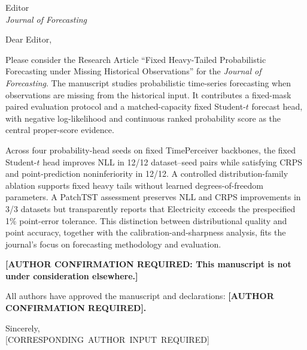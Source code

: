 \documentclass[11pt]{article}
\begin{document}
\thispagestyle{empty}
\noindent Editor\\
\emph{Journal of Forecasting}

\vspace{1em}
\noindent Dear Editor,

Please consider the Research Article ``Fixed Heavy-Tailed Probabilistic Forecasting under Missing Historical Observations'' for the \emph{Journal of Forecasting}. The manuscript studies probabilistic time-series forecasting when observations are missing from the historical input. It contributes a fixed-mask paired evaluation protocol and a matched-capacity fixed Student-$t$ forecast head, with negative log-likelihood and continuous ranked probability score as the central proper-score evidence.

Across four probability-head seeds on fixed TimePerceiver backbones, the fixed Student-$t$ head improves NLL in 12/12 dataset--seed pairs while satisfying CRPS and point-prediction noninferiority in 12/12. A controlled distribution-family ablation supports fixed heavy tails without learned degrees-of-freedom parameters. A PatchTST assessment preserves NLL and CRPS improvements in 3/3 datasets but transparently reports that Electricity exceeds the prespecified 1\% point-error tolerance. This distinction between distributional quality and point accuracy, together with the calibration-and-sharpness analysis, fits the journal's focus on forecasting methodology and evaluation.

\textbf{[AUTHOR CONFIRMATION REQUIRED: This manuscript is not under consideration elsewhere.]}

All authors have approved the manuscript and declarations: \textbf{[AUTHOR CONFIRMATION REQUIRED].}

\noindent Sincerely,\\
\mbox{[CORRESPONDING AUTHOR INPUT REQUIRED]}
\end{document}
